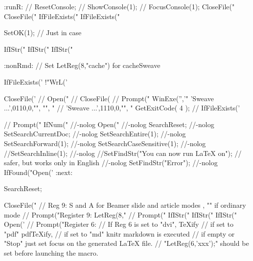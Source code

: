 :runR:
//  ResetConsole;
//  ShowConsole(1);
//  FocusConsole(1);
  CloseFile("%
  CloseFile("%
  IfFileExists("%
  IfFileExists("%



SetOK(1); // Just in case

  IfIStr("%
  IfIStr("%
  IfIStr("%

:nonRmd:
  // Set LetReg(8,"cache") for cacheSweave

  IfFileExists('%
       !"WrL('%


  CloseFile('%
//  Open("%
//  CloseFile(%
//  Prompt("%
  WinExe('','"%
         'Sweave ...',0110,0,"", "", "%
//         'Sweave ...',1110,0,"", "%
  GetExitCode( 4 );
//  IfFileExists('%

//  Prompt("%
  IfNum("%
//-nolog   Open("%
//-nolog  SearchReset;
//-nolog  SetSearchCurrentDoc;
//-nolog  SetSearchEntire(1);
//-nolog  SetSearchForward(1);
//-nolog  SetSearchCaseSensitive(1);
//-nolog  //SetSearchInline(1);
//-nolog   //SetFindStr("You can now run LaTeX on"); // safer, but works only in English
//-nolog   SetFindStr("Error");
//-nolog   IfFound("Open('%
:next:

 SearchReset;

  CloseFile("%
//  Reg 9: S and A for Beamer slide and article modes , "" if ordinary mode
//  Prompt("Register 9: %
  LetReg(8,"%
//  Prompt("%
  IfIStr("%
  IfIStr("%
  IfIStr("%
  Open('%
//  Prompt("Register 6: %
// If Reg 6 is set to "dvi", TeXify %
// if set to "pdf" pdfTeXify,
// if set to "md" knitr markdown is executed
// if empty or "Stop" just set focus on the generated LaTeX file.
// "LetReg(6,'xxx');" should be set before launching the macro.

